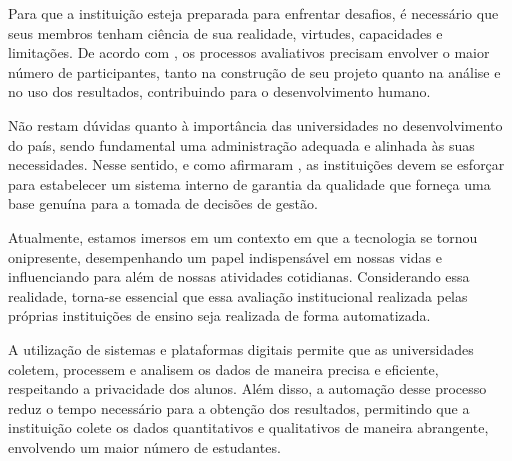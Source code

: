 

Para que a instituição esteja preparada para enfrentar desafios, é necessário que seus membros tenham ciência de sua realidade, virtudes, capacidades e limitações.
De acordo com , os processos avaliativos precisam envolver o maior número de participantes, tanto na construção de seu projeto quanto na análise e no uso dos resultados, contribuindo para o desenvolvimento humano.


Não restam dúvidas quanto à importância das universidades no desenvolvimento do país, sendo fundamental uma administração adequada e alinhada às suas necessidades. Nesse sentido, e como afirmaram , as instituições devem se esforçar para estabelecer um sistema interno de garantia da qualidade que forneça uma base genuína para a tomada de decisões de gestão. 

Atualmente, estamos imersos em um contexto em que a tecnologia se tornou onipresente, desempenhando um papel indispensável em nossas vidas e influenciando para além de nossas atividades cotidianas. Considerando essa realidade, torna-se essencial que essa avaliação institucional realizada pelas próprias instituições de ensino seja realizada de forma automatizada. 

A utilização de sistemas e plataformas digitais permite que as universidades coletem, processem e analisem os dados de maneira precisa e eficiente, respeitando a privacidade dos alunos. Além disso, a automação desse processo reduz o tempo necessário para a obtenção dos resultados, permitindo que a instituição colete os dados quantitativos e qualitativos de maneira abrangente, envolvendo um maior número de estudantes.


